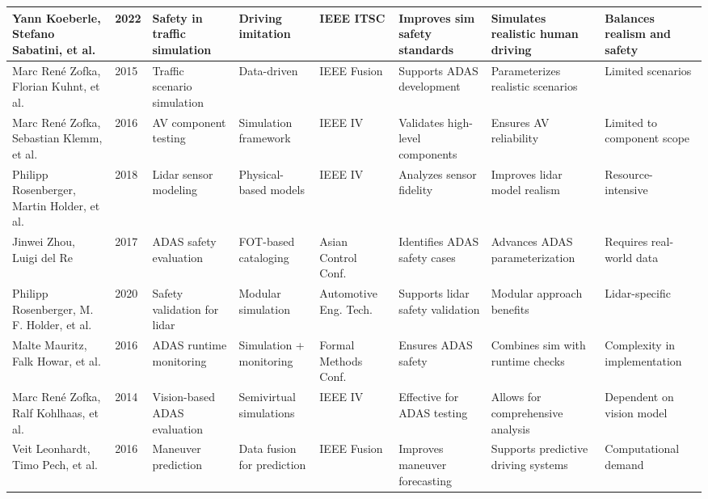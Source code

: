 \documentclass[lettersize,journal]{IEEEtran}
\begin{document}
\begin{longtable}{|p{2cm}|p{1cm}|p{2cm}|p{2cm}|p{2cm}|p{2cm}|p{2cm}|p{2.5cm}|}
\hline
Yann Koeberle, Stefano Sabatini, et al. & 2022 & Safety in traffic simulation & Driving imitation & IEEE ITSC & Improves sim safety standards & Simulates realistic human driving & Balances realism and safety \\
\hline
Marc René Zofka, Florian Kuhnt, et al. & 2015 & Traffic scenario simulation & Data-driven & IEEE Fusion & Supports ADAS development & Parameterizes realistic scenarios & Limited scenarios \\
\hline
Marc René Zofka, Sebastian Klemm, et al. & 2016 & AV component testing & Simulation framework & IEEE IV & Validates high-level components & Ensures AV reliability & Limited to component scope \\
\hline
Philipp Rosenberger, Martin Holder, et al. & 2018 & Lidar sensor modeling & Physical-based models & IEEE IV & Analyzes sensor fidelity & Improves lidar model realism & Resource-intensive \\
\hline
Jinwei Zhou, Luigi del Re & 2017 & ADAS safety evaluation & FOT-based cataloging & Asian Control Conf. & Identifies ADAS safety cases & Advances ADAS parameterization & Requires real-world data \\
\hline
Philipp Rosenberger, M. F. Holder, et al. & 2020 & Safety validation for lidar & Modular simulation & Automotive Eng. Tech. & Supports lidar safety validation & Modular approach benefits & Lidar-specific \\
\hline
Malte Mauritz, Falk Howar, et al. & 2016 & ADAS runtime monitoring & Simulation + monitoring & Formal Methods Conf. & Ensures ADAS safety & Combines sim with runtime checks & Complexity in implementation \\
\hline
Marc René Zofka, Ralf Kohlhaas, et al. & 2014 & Vision-based ADAS evaluation & Semivirtual simulations & IEEE IV & Effective for ADAS testing & Allows for comprehensive analysis & Dependent on vision model \\
\hline
Veit Leonhardt, Timo Pech, et al. & 2016 & Maneuver prediction & Data fusion for prediction & IEEE Fusion & Improves maneuver forecasting & Supports predictive driving systems & Computational demand \\
\hline


\end{longtable}
\end{document}
